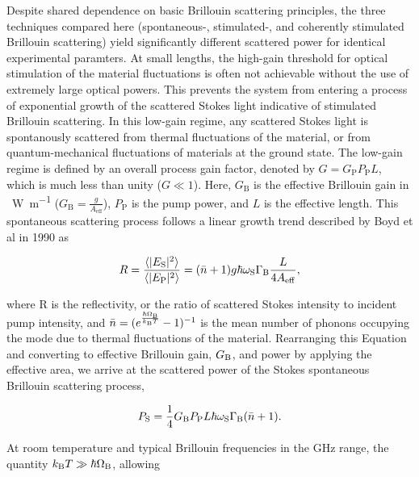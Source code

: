 Despite shared dependence on basic Brillouin scattering principles, the three techniques compared here (spontaneous-, stimulated-, and coherently stimulated Brillouin scattering) yield significantly different scattered power for identical experimental paramters. At small lengths, the high-gain threshold for optical stimulation of the material fluctuations is often not achievable without the use of extremely large optical powers. This prevents the system from entering a process of exponential growth of the scattered Stokes light indicative of stimulated Brillouin scattering.\cite{boyd2020nonlinear} In this low-gain regime, any scattered Stokes light is spontanously scattered from thermal fluctuations of the material, or from quantum-mechanical fluctuations of materials at the ground state. The low-gain regime is defined by an overall process gain factor, denoted by \(G = G_{\mathrm{P}}P_{\mathrm{P}}L\), which is much less than unity (\(G \ll 1\)). Here, \(G_{\mathrm{B}}\) is the effective Brillouin gain in \si{\per\watt\per\meter} (\(G_{\mathrm{B}} = \frac{g}{A_{\mathrm{eff}}}\)), \(P_{\mathrm{P}}\) is the pump power, and \(L\) is the effective length. This spontaneous scattering process follows a linear growth trend described by Boyd et al in 1990 \cite{boyd1990noise} as

\begin{equation}
  R = \frac{\langle|E_{\rm S}|^{2}\rangle}{\langle|E_{\rm P}|^{2}\rangle} = (\bar{n} + 1)g\hbar\omega_{\rm S}\Gamma_{\rm B}\frac{L}{4A_{\rm eff}},
\end{equation}

where R is the reflectivity, or the ratio of scattered Stokes intensity to incident pump intensity, and \(\bar{n} = (e^{\frac{\hbar\Omega_{\rm B}}{k_{\rm B}T}} - 1)^{-1}\) is the mean number of phonons occupying the mode due to thermal fluctuations of the material. Rearranging this Equation and converting to effective Brillouin gain, \(G_{\rm B}\), and power by applying the effective area, we arrive at the scattered power of the Stokes spontaneous Brillouin scattering process,

\begin{equation}
  P_{\rm S} = \frac{1}{4}G_{\rm B}P_{\rm P}L\hbar\omega_{\rm S}\Gamma_{\rm B}(\bar{n} + 1).
  \label{eq:SponBSnbar}
\end{equation}

At room temperature and typical Brillouin frequencies in the GHz range, the quantity \(k_{\rm B}T \gg \hbar\Omega_{\rm B}\), allowing

